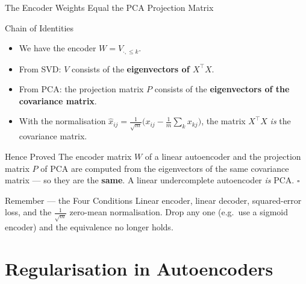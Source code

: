 \documentclass{beamer}
\begin{document}
\begin{frame}[shrink=10]{The Encoder Weights Equal the PCA Projection Matrix}
  \begin{block}{Chain of Identities}
    \begin{itemize}\setlength\itemsep{4pt}
      \item We have the encoder $W = V_{\cdot,\le k}$.
      \item From SVD: $V$ consists of the \textbf{eigenvectors of $X^{\top}X$}.
      \item From PCA: the projection matrix $P$ consists of the
            \textbf{eigenvectors of the covariance matrix}.
      \item With the normalisation
            $\hat{x}_{ij}=\frac{1}{\sqrt{m}}\bigl(x_{ij}-\frac1m\sum_k x_{kj}\bigr)$,
            the matrix $X^{\top}X$ \emph{is} the covariance matrix.
    \end{itemize}
  \end{block}

  \begin{alertblock}{Hence Proved}
    The encoder matrix $W$ of a linear autoencoder and the projection
    matrix $P$ of PCA are computed from the eigenvectors of the same
    covariance matrix --- so they are the \textbf{same}. A linear
    undercomplete autoencoder \emph{is} PCA. \hfill $\square$
  \end{alertblock}

  \begin{block}{Remember --- the Four Conditions}
    Linear encoder, linear decoder, squared-error loss, and the
    $\frac{1}{\sqrt m}$ zero-mean normalisation. Drop any one (e.g.\ use a
    sigmoid encoder) and the equivalence no longer holds.
  \end{block}
\end{frame}

\section{Regularisation in Autoencoders}
\end{document}
